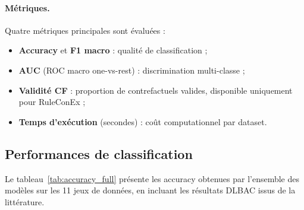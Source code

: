 \documentclass[12pt,a4paper]{article}
\begin{document}
\paragraph{Métriques.}
Quatre métriques principales sont évaluées :
\begin{itemize}
  \item \textbf{Accuracy} et \textbf{F1 macro} : qualité de classification ;
  \item \textbf{AUC} (ROC macro one-vs-rest) : discrimination multi-classe ;
  \item \textbf{Validité CF} : proportion de contrefactuels valides, disponible
        uniquement pour RuleConEx ;
  \item \textbf{Temps d'exécution} (secondes) : coût computationnel par dataset.
\end{itemize}

\subsection{Performances de classification}
\label{sec:perf_classif}

Le tableau~\ref{tab:accuracy_full} présente les accuracy obtenues par l'ensemble
des modèles sur les 11 jeux de données, en incluant les résultats DLBAC issus de
la littérature.
\end{document}
